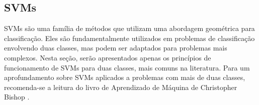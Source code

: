 


 
\subsection{SVMs}
\label{subsection:SVMs}

SVMs são uma família de métodos que utilizam uma abordagem geométrica para classificação. Eles são fundamentalmente utilizados em problemas de classificação envolvendo duas classes, mas podem ser adaptados para problemas mais complexos. Nesta seção, serão apresentados apenas os princípios de funcionamento de SVMs para duas classes, mais comuns na literatura. Para um aprofundamento sobre SVMs aplicados a problemas com mais de duas classes, recomenda-se a leitura do livro de Aprendizado de Máquina de Christopher Bishop \cite{bishop}.

